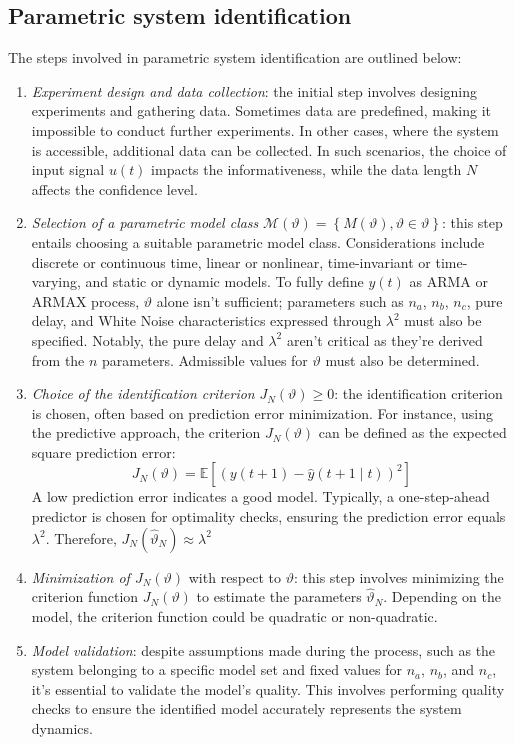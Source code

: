 \subsection{Parametric system identification}
The steps involved in parametric system identification are outlined below:
\begin{enumerate} 
    \item \textit{Experiment design and data collection}: the initial step involves designing experiments and gathering data. 
        Sometimes data are predefined, making it impossible to conduct further experiments. 
        In other cases, where the system is accessible, additional data can be collected. 
        In such scenarios, the choice of input signal $u(t)$ impacts the informativeness, while the data length $N$ affects the confidence level.
    \item \textit{Selection of a parametric model class} $\mathcal{M}(\vartheta)=\left\{ M(\vartheta),\vartheta \in \vartheta\right\}$: this step entails choosing a suitable parametric model class.
        Considerations include discrete or continuous time, linear or nonlinear, time-invariant or time-varying, and static or dynamic models. 
        To fully define $y(t)$ as ARMA or ARMAX process, $\vartheta$ alone isn't sufficient; parameters such as $n_a$, $n_b$, $n_c$, pure delay, and  White Noise characteristics expressed through $\lambda^2$ must also be specified.
        Notably, the pure delay and $\lambda^2$ aren't critical as they're derived from the $n$ parameters.
        Admissible values for $\vartheta$ must also be determined.
    \item \textit{Choice of the identification criterion} $J_N(\vartheta)\geq 0$: the identification criterion is chosen, often based on prediction error minimization. 
        For instance, using the predictive approach, the criterion $J_N(\vartheta)$ can be defined as the expected square prediction error:
        \[J_N(\vartheta)=\mathbb{E}\left[ \left(y(t+1)-\hat{y}(t+1\mid t)\right)^2 \right]\]
        A low prediction error indicates a good model.
        Typically, a one-step-ahead predictor is chosen for optimality checks, ensuring the prediction error equals $\lambda^2$.
        Therefore, $J_N(\hat{\vartheta}_N) \approx \lambda^2$
    \item \textit{Minimization of $J_N(\vartheta)$} with respect to $\vartheta$: this step involves minimizing the criterion function $J_N(\vartheta)$ to estimate the parameters $\hat{\vartheta}_N$.
        Depending on the model, the criterion function could be quadratic or non-quadratic.
    \item \textit{Model validation}: despite assumptions made during the process, such as the system belonging to a specific model set and fixed values for $n_a$, $n_b$, and $n_c$, it's essential to validate the model's quality. 
        This involves performing quality checks to ensure the identified model accurately represents the system dynamics.
\end{enumerate}